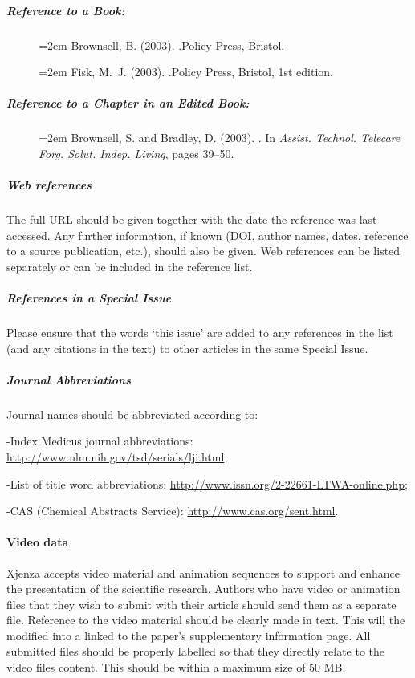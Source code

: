 \subparagraph{Reference to a Book:}
\begin{description}
\item[] \hangindent=2em Brownsell, B. (2003). .\newblock Policy Press, Bristol.
\item[] \hangindent=2em Fisk, M.~J. (2003). .\newblock Policy Press, Bristol, 1st edition.
\end{description}

\subparagraph{Reference to a Chapter in an Edited Book:}
\begin{description}
\item[] \hangindent=2em Brownsell, S. and Bradley, D. (2003). . \newblock In {\em Assist. Technol. Telecare Forg. Solut. Indep. Living}, pages 39--50.
\end{description}

\subparagraph{Web references}

The full URL should be given together with the date the reference was last accessed. Any further information, if known (DOI, author names, dates, reference to a source publication, etc.), should also be given. Web references can be listed separately or can be included in the reference list.

\subparagraph{References in a Special Issue}

Please ensure that the words `this issue' are added to any references in the list (and any citations in the text) to other articles in the same Special Issue.

\subparagraph{Journal Abbreviations}
Journal names should be abbreviated according to:

-Index Medicus journal abbreviations: \url{http://www.nlm.nih.gov/tsd/serials/lji.html};

-List of title word abbreviations: \url{http://www.issn.org/2-22661-LTWA-online.php};

-CAS (Chemical Abstracts Service): \url{http://www.cas.org/sent.html}.

\paragraph{Video data}

Xjenza accepts video material and animation sequences to support and enhance the presentation of the scientific research. Authors who have video or animation files that they wish to submit with their article should send them as a separate file. Reference to the video material should be clearly made in text. This will the modified into a linked to the paper's supplementary information page. All submitted files should be properly labelled so that they directly relate to the video files content. This should be within a maximum size of 50 MB.

